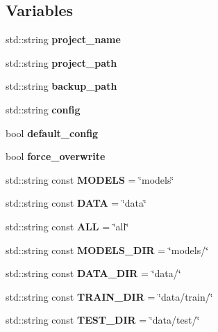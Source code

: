 \subsection*{Variables}
\begin{DoxyCompactItemize}
\item 
\mbox{\label{namespacemlm_aee756fe1829a2af57f9f355c5f0b8b64}} 
std\+::string {\bfseries project\+\_\+name}
\item 
\mbox{\label{namespacemlm_a6cc713ef34723bb1c8ba49e1c53a501a}} 
std\+::string {\bfseries project\+\_\+path}
\item 
\mbox{\label{namespacemlm_a361d0ba340ac9a12b8336288a59554b5}} 
std\+::string {\bfseries backup\+\_\+path}
\item 
\mbox{\label{namespacemlm_ad47c4cd8f3caf340ee8206e79c50fba2}} 
std\+::string {\bfseries config}
\item 
\mbox{\label{namespacemlm_a12b2ef7be085e99d74d7dd86be85a549}} 
bool {\bfseries default\+\_\+config}
\item 
\mbox{\label{namespacemlm_aa2dab6dc3be65449e7e08fdfc46e35c9}} 
bool {\bfseries force\+\_\+overwrite}
\item 
\mbox{\label{namespacemlm_a2db81026a97bae48420441bbdf348f51}} 
std\+::string const {\bfseries M\+O\+D\+E\+LS} = \char`\"{}models\char`\"{}
\item 
\mbox{\label{namespacemlm_a5257b9fdd666c44be12d500b7dbeab2f}} 
std\+::string const {\bfseries D\+A\+TA} = \char`\"{}data\char`\"{}
\item 
\mbox{\label{namespacemlm_a148d63d7f5644c58b7cd707e9185bb84}} 
std\+::string const {\bfseries A\+LL} = \char`\"{}all\char`\"{}
\item 
\mbox{\label{namespacemlm_a63a68ac942ea02966ea302cd4df43de3}} 
std\+::string const {\bfseries M\+O\+D\+E\+L\+S\+\_\+\+D\+IR} = \char`\"{}models/\char`\"{}
\item 
\mbox{\label{namespacemlm_abc598e2993d4e528db5c8a5a3e6151d1}} 
std\+::string const {\bfseries D\+A\+T\+A\+\_\+\+D\+IR} = \char`\"{}data/\char`\"{}
\item 
\mbox{\label{namespacemlm_ace5888bdbfc2778d436540b5f5ecd058}} 
std\+::string const {\bfseries T\+R\+A\+I\+N\+\_\+\+D\+IR} = \char`\"{}data/train/\char`\"{}
\item 
\mbox{\label{namespacemlm_a7b783c33cac71cf8406949443e182dd5}} 
std\+::string const {\bfseries T\+E\+S\+T\+\_\+\+D\+IR} = \char`\"{}data/test/\char`\"{}
\end{DoxyCompactItemize}


